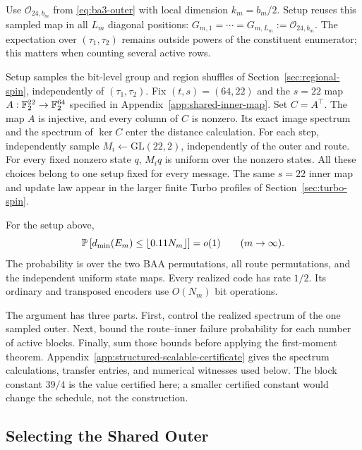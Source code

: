 Use $\mathcal O_{24,b_m}$ from \eqref{eq:ba3-outer} with local dimension
$k_m=b_m/2$. Setup reuses this sampled
map in all $L_m$ diagonal positions:
$G_{m,1}=\cdots=G_{m,L_m}:=\mathcal O_{24,b_m}$.
The expectation over $(\tau_1,\tau_2)$ remains outside powers of the
constituent enumerator; this matters when counting several active rows.

Setup samples the bit-level group and region shuffles of
Section~\ref{sec:regional-spin}, independently of $(\tau_1,\tau_2)$.
Fix $(t,s)=(64,22)$ and the $s=22$ map
$A:\mathbb F_2^{22}\to\mathbb F_2^{64}$ specified in Appendix~\ref{app:shared-inner-map}.
Set $C=A^\top$. The map $A$ is injective, and every column of $C$ is
nonzero. Its exact image spectrum and the spectrum of $\ker C$ enter
the distance calculation. For each step, independently sample
$M_i\gets\mathrm{GL}(22,2)$, independently of the outer and route.
For every fixed nonzero state $q$, $M_iq$ is uniform over the nonzero
states. All these choices belong to one setup fixed for every message.
The same $s=22$ inner map and update law appear in the larger finite
Turbo profiles of Section~\ref{sec:turbo-spin}.

\begin{theorem}
\label{thm:structured-spin-scalable}
For the setup above,
\begin{equation}
  \mathbb P\left[
    d_{\min}(E_m)\le\lfloor0.11N_m\rfloor
  \right]
  =o(1)
  \qquad(m\to\infty).
  \label{eq:structured-spin-distance}
\end{equation}
The probability is over the two BAA permutations, all route permutations,
and the independent uniform state maps. Every realized code has rate $1/2$. Its ordinary
and transposed encoders use $O(N_m)$ bit operations.
\end{theorem}

The argument has three parts. First, control the realized spectrum of the
one sampled outer. Next, bound the route--inner failure probability for
each number of active blocks. Finally, sum those bounds before applying
the first-moment theorem. Appendix~\ref{app:structured-scalable-certificate}
gives the spectrum calculations, transfer entries, and numerical witnesses
used below.
The block constant $39/4$ is the value certified here; a smaller certified
constant would change the schedule, not the construction.

\subsection{Selecting the Shared Outer}

